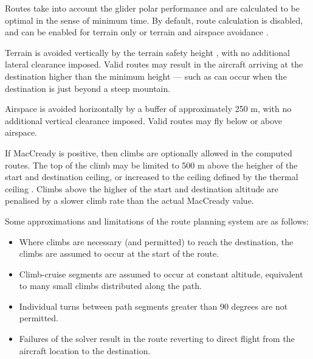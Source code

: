 Routes take into account the glider polar performance and are
calculated to be optimal in the sense of minimum time.  By default,
route calculation is disabled, and can be enabled for terrain only or
terrain and airspace avoidance .

Terrain is avoided vertically by the terrain safety height
, with no additional lateral clearance imposed.
Valid routes may result in the aircraft arriving at the destination
higher than the minimum height --- such as can occur when the
destination is just beyond a steep mountain.

Airspace is avoided horizontally by a buffer of approximately 250 m,
with no additional vertical clearance imposed.  Valid routes may fly
below or above airspace.

If MacCready is positive, then climbs are optionally allowed
 in the computed routes.  The top of the climb
may be limited to 500 m above the heigher of the start and destination
ceiling, or increased to the ceiling defined by the thermal ceiling
.  Climbs above the higher of the start and
destination altitude are penalised by a slower climb rate than the
actual MacCready value.

Some approximations and limitations of the route planning system are as follows:
\begin{itemize}
\item Where climbs are necessary (and permitted) to reach the destination,
the climbs are assumed to occur at the start of the route.
\item Climb-cruise segments are assumed to occur at constant altitude,
equivalent to many small climbs distributed along the path.
\item Individual turns between path segments greater than 90 degrees
  are not permitted.
\item Failures of the solver result in the route reverting to direct flight
from the aircraft location to the destination.
\end{itemize}

